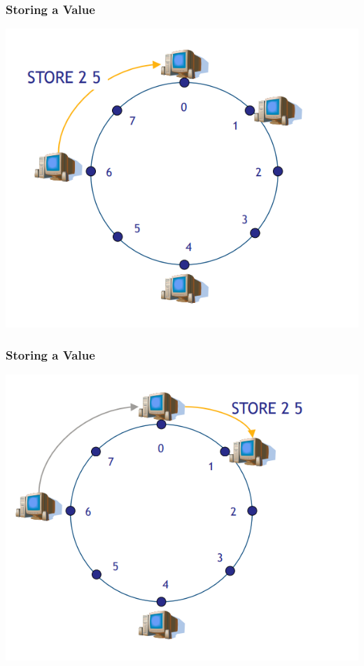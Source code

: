 \begin{frame}
    \frametitle{Storing a Value}
    \includegraphics[scale=0.3]{figures/chord7.png}
\end{frame}

\begin{frame}
    \frametitle{Storing a Value}
    \includegraphics[scale=0.3]{figures/chord8.png}
\end{frame}

